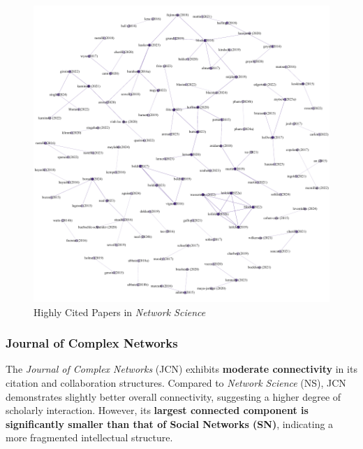 \documentclass[twocolumn]{article}
\begin{document}
	\begin{figure}[htbp]
		\centering
		\includegraphics[width=\columnwidth]{"Network Science/Gephi/highly_cited.pdf"}
		\caption{Highly Cited Papers in \textit{Network Science}}
		\label{fig.fig5}
	\end{figure}
	
	\subsubsection*{Journal of Complex Networks}
	
	The \textit{Journal of Complex Networks} (JCN) exhibits \textbf{moderate connectivity} in its citation and collaboration structures. Compared to \textit{Network Science} (NS), JCN demonstrates slightly better overall connectivity, suggesting a higher degree of scholarly interaction. However, its \textbf{largest connected component is significantly smaller than that of Social Networks (SN)}, indicating a more fragmented intellectual structure.
	
\end{document}
